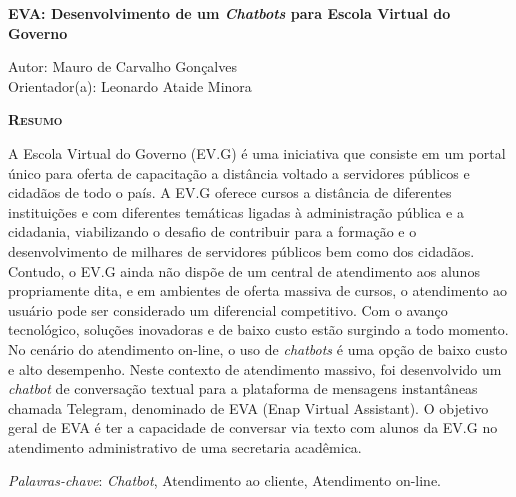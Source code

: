 \begin{center}
	{\Large{\textbf{EVA: Desenvolvimento de um \textit{Chatbots} para Escola Virtual do Governo}}}
\end{center}

\vspace{1cm}

\begin{flushright}
	Autor: Mauro de Carvalho Gonçalves\\
	Orientador(a): Leonardo Ataide Minora
\end{flushright}

\vspace{1cm}

\begin{center}
	\Large{\textsc{\textbf{Resumo}}}
\end{center}

\noindent A Escola Virtual do Governo (EV.G) é uma iniciativa que consiste em um portal único para oferta de capacitação a distância voltado a servidores públicos e cidadãos de todo o país.
A EV.G oferece cursos a distância de diferentes instituições e com diferentes temáticas ligadas à administração pública e a cidadania, viabilizando o desafio de contribuir para a formação e o desenvolvimento de milhares de servidores públicos bem como dos cidadãos.
Contudo, o EV.G ainda não dispõe de um central de atendimento aos alunos propriamente dita, e em ambientes de oferta massiva de cursos, o atendimento ao usuário pode ser considerado um diferencial competitivo.
Com o avanço tecnológico, soluções inovadoras e de baixo custo estão surgindo a todo momento. No cenário do atendimento on-line, o uso de \textit{chatbots} é uma opção de baixo custo e alto desempenho. 
Neste contexto de atendimento massivo, foi desenvolvido um \textit{chatbot} de conversação textual para a plataforma de mensagens instantâneas chamada Telegram, denominado de EVA (Enap Virtual Assistant). O objetivo geral de EVA é ter a capacidade de conversar via texto com alunos da EV.G no atendimento administrativo de uma secretaria acadêmica.


\noindent\textit{Palavras-chave}: \textit{Chatbot}, Atendimento ao cliente, Atendimento on-line.